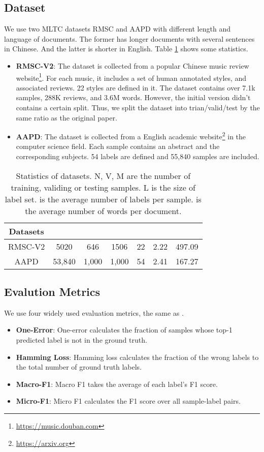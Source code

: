 \documentclass[runningheads]{llncs}
\begin{document}
\subsection{Dataset}
We use two MLTC datasets RMSC\cite{zhao2018review} and AAPD\cite{yang2018sgm} with different length and language of documents. The former has longer documents with several sentences in Chinese. And the latter is shorter in English. Table \ref{tab:dataset} shows some statistics.
\begin{itemize}
    \item \textbf{RMSC-V2}\cite{zhao2018review}: The dataset is collected from a popular Chinese music review website\footnote{\url{https://music.douban.com}}. For each music, it includes a set of human annotated styles, and associated reviews. 22 styles are defined in it. The dataset contains over 7.1k samples, 288K reviews, and 3.6M words. However, the initial version didn't contains a certain split. Thus, we split the dataset into trian/valid/test by the same ratio as the original paper.
    \item \textbf{AAPD}\cite{yang2018sgm}: The dataset is collected from a English academic website\footnote{\url{https://arxiv.org}} in the computer science field. Each sample contains an abstract and the corresponding subjects. 54 labels are defined and 55,840 samples are included.
\end{itemize}
\begin{table}[htb]
    \centering
    \setlength{\abovecaptionskip}{0.3cm}
    \begin{tabular}{c|cccccc}
        \hline
        Datasets &  &  &  &  &  &  \\ \hline
        RMSC-V2 & 5020 & 646 & 1506 & 22 & 2.22 & 497.09 \\
        AAPD & 53,840 & 1,000 & 1,000 & 54 & 2.41 & 167.27 \\
        \hline
    \end{tabular}
    \caption{Statistics of datasets. N, V, M are the number of training, validing or testing samples. L is the size of label set.  is the average number of labels per sample.  is the average number of words per document.}
    \label{tab:dataset}
\end{table}

\subsection{Evalution Metrics}
We use four widely used evaluation metrics, the same as \cite{chen2017ensemble,yang2018sgm,zhao2018review}.
\begin{itemize}
    \item \textbf{One-Error}: One-error calculates the fraction of samples whose top-1 predicted label is not in the ground truth.
    \item \textbf{Hamming Loss}: Hamming loss calculates the fraction of the wrong labels to the total number of ground truth labels.
    \item \textbf{Macro-F1}: Macro F1 takes the average of each label's F1 score.
    \item \textbf{Micro-F1}: Micro F1 calculates the F1 score over all sample-label pairs.
\end{itemize}
\end{document}
